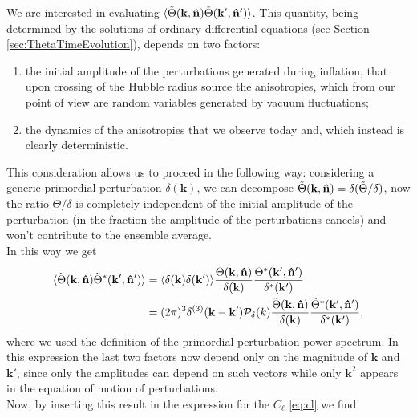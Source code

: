 We are interested in evaluating $\langle\tilde\Theta(\mathbf{k},\mathbf{\hat{n}})\tilde\Theta(\mathbf{k}',\mathbf{\hat{n}}')\rangle$. This quantity, being determined by the solutions of ordinary differential equations (see Section \ref{sec:ThetaTimeEvolution}), depends on two factors:
\begin{enumerate}
    \item the initial amplitude of the perturbations generated during inflation, that upon crossing of the Hubble radius source the anisotropies, which from our point of view are random variables generated by vacuum fluctuations;
    \item the dynamics of the anisotropies that we observe today and, which instead is clearly deterministic. 
\end{enumerate}
This consideration allows us to proceed in the following way: considering a generic primordial perturbation $\delta(\mathbf{k})$, we can decompose $ \tilde\Theta(\mathbf{k},\mathbf{\hat{n}})=\delta (\tilde\Theta/\delta) $, now the ratio $\tilde\Theta/\delta$ is completely independent of the initial amplitude of the perturbation (in the fraction the amplitude of the perturbations cancels) and won't contribute to the ensemble average.\\
In this way we get
\begin{align*}
    \langle\tilde\Theta(\mathbf{k},\mathbf{\hat{n}})\tilde\Theta^*(\mathbf{k}',\mathbf{\hat{n}}')\rangle &= \langle\delta(\mathbf{k})\delta(\mathbf{k}')\rangle\frac{\tilde\Theta(\mathbf{k},\mathbf{\hat{n}})}{\delta(\mathbf{k})}\frac{\tilde\Theta^*(\mathbf{k}',\mathbf{\hat{n}}')}{\delta^*(\mathbf{k}')}\\
    &= (2\pi)^3\delta^{(3)}(\mathbf{k}-\mathbf{k}')\mathcal P_{\delta}(k)\frac{\tilde\Theta(\mathbf{k},\mathbf{\hat{n}})}{\delta(\mathbf{k})}\frac{\tilde\Theta^*(\mathbf{k}',\mathbf{\hat{n}}')}{\delta^*(\mathbf{k}')},
\end{align*}
where we used the definition of the primordial perturbation power spectrum. In this expression the last two factors now depend only on the magnitude of $\mathbf k$ and $\mathbf k'$, since only the amplitudes can depend on such vectors while only $\mathbf k^2$ appears in the equation of motion of perturbations.\\Now, by inserting this result in the expression for the $C_\ell$ \eqref{eq:cl} we find 
